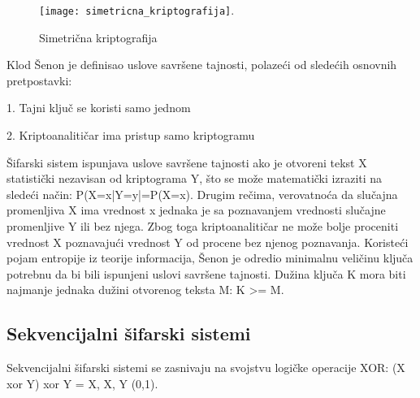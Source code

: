 \documentclass[a4paper]{article}
\begin{document}
\begin{figure}[h!]
    \centering
    \texttt{[image: simetricna\_kriptografija]}.
    \caption{Simetrična kriptografija}
    \label{fig:simetična_kriptografija}
\end{figure}

Klod Šenon je definisao uslove savršene tajnosti, polazeći od sledećih osnovnih pretpostavki:

1. Tajni ključ se koristi samo jednom

2. Kriptoanalitičar ima pristup samo kriptogramu

Šifarski sistem ispunjava uslove savršene tajnosti ako je otvoreni tekst X statistički nezavisan od kriptograma Y, što se može matematički izraziti na sledeći način: P(X=x|Y=y|=P(X=x). Drugim rečima, verovatnoća da slučajna promenljiva X ima vrednost x jednaka je sa poznavanjem vrednosti slučajne promenljive Y ili bez njega. Zbog toga kriptoanalitičar ne može bolje proceniti vrednost X poznavajući vrednost Y od procene bez njenog poznavanja. Koristeći pojam entropije iz teorije informacija, Šenon je odredio minimalnu veličinu ključa potrebnu da bi bili ispunjeni uslovi savršene tajnosti. Dužina ključa K mora biti najmanje jednaka dužini otvorenog teksta M: K >= M.

\newpage
\subsection{Sekvencijalni šifarski sistemi}
\label{subsec:sekvencijalni_šifarski_sistemi}

Sekvencijalni šifarski sistemi se zasnivaju na svojstvu logičke operacije XOR: (X xor Y) xor Y = X, X, Y \in (0,1).
\end{document}

